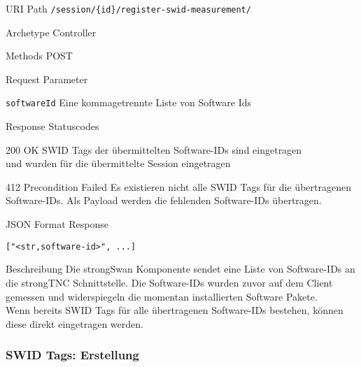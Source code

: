 \documentclass[10pt,a4paper]{scrartcl}
\begin{document}
\begin{mdframed}[style=def]
\begin{description*}
	\item[URI Path] \texttt{/session/\{id\}/register-swid-measurement/}
	\item[Archetype] Controller
	\item[Methods] POST
	\item[Request Parameter] \hfill
	\begin{description*}
		\item[\texttt{softwareId}] Eine kommagetrennte Liste von Software Ids
	\end{description*}
	\item[Response Statuscodes] \hfill
		\begin{description*}
			\item[200 OK] SWID Tags der übermittelten Software-IDs sind eingetragen \\
			und wurden für die übermittelte Session eingetragen
			\item[412 Precondition Failed] Es existieren nicht alle SWID Tags für die übertragenen Software-IDs. Als Payload werden die fehlenden Software-IDs übertragen.
		\end{description*}
	\item[JSON Format Response] \hfill
\begin{lstlisting}
["<str,software-id>", ...]
\end{lstlisting}
	\item[Beschreibung] Die strongSwan Komponente sendet eine Liste von
		Software-IDs an die strongTNC Schnittstelle. Die Software-IDs wurden zuvor
		auf dem Client gemessen und widerspiegeln die momentan installierten
		Software Pakete.\\
		Wenn bereits SWID Tags für alle übertragenen Software-IDs bestehen, können
		diese direkt eingetragen werden.
\end{description*}
\end{mdframed}


\subsubsection{SWID Tags: Erstellung}
\end{document}
